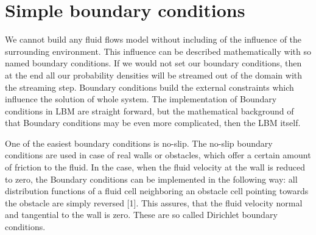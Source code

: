 
\section{Simple boundary conditions}

We cannot build any fluid flows model without including of the influence of the surrounding environment. This influence can be described mathematically with so named boundary conditions. If we would not set our boundary conditions, then at the end all our probability densities will be streamed out of the domain with the streaming step. Boundary conditions build the external constraints which influence the solution of whole system. The implementation of Boundary conditions in LBM are straight forward, but the mathematical background of that Boundary conditions may be even more complicated, then the LBM itself.

One of the easiest boundary conditions is no-slip. The no-slip boundary conditions are used in case of real walls or obstacles, which offer a certain amount of friction to the fluid. In the case, when the fluid velocity at the wall is reduced to zero, the Boundary conditions can be implemented in the following way: all distribution functions of a fluid cell neighboring an obstacle cell pointing towards the obstacle are simply reversed [1]. This assures, that the fluid velocity normal and tangential to the wall is zero. These are so called Dirichlet boundary conditions.

